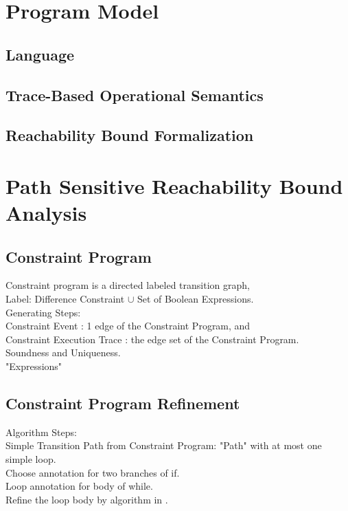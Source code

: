 \documentclass[sigplan,10pt,review,anonymous]{acmart}
\begin{document}
\section{{Program Model}}
\label{sec:language}
\subsection{Language}
\subsection{Trace-Based Operational Semantics}
% 
\subsection{{Reachability Bound Formalization}}
\label{sec:execution_rb}
% 
\section{Path Sensitive Reachability Bound Analysis}
\label{sec:static_rb}
% 
\subsection{Constraint Program}
Constraint program is a directed labeled transition graph,
\\
Label: Difference Constraint $\cup$ Set of Boolean Expressions.
\\
Generating Steps: 
\\
Constraint Event : 1 edge of the Constraint Program, and 
\\
Constraint Execution Trace : the edge set of the Constraint Program.
\\
Soundness and Uniqueness.
\\
"Expressions"
\subsection{Constraint Program Refinement}
Algorithm Steps:
\\
Simple Transition Path from Constraint Program: "Path" with at most one simple loop.
\\
Choose annotation for two branches of if.
\\
Loop annotation for body of while.
\\
Refine the loop body by algorithm in \cite{GulwaniJK09}.
%
\end{document}
